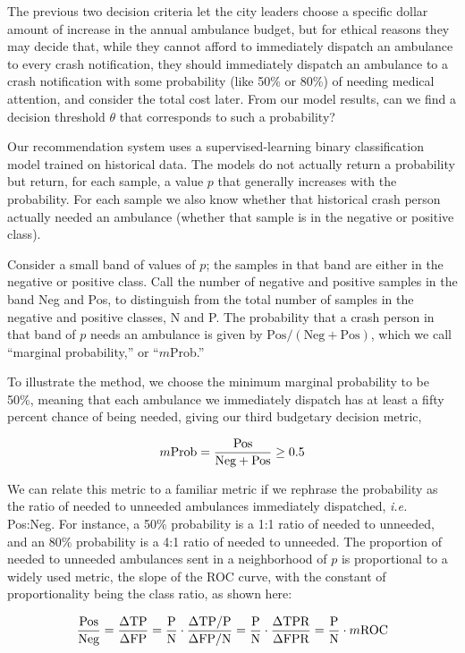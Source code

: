 The previous two decision criteria let the city leaders choose a specific dollar amount of increase in the annual ambulance budget, but for ethical reasons they may decide that, while they cannot afford to immediately dispatch an ambulance to every crash notification, they should immediately dispatch an ambulance to a crash notification with some probability (like 50\% or 80\%) of needing medical attention, and consider the total cost later.  From our model results, can we find a decision threshold $\theta$ that corresponds to such a probability?

Our recommendation system uses a supervised-learning binary classification model trained on historical data. The models do not actually return a probability but return, for each sample, a value $p$ that generally increases with the probability.  For each sample we also know whether that historical crash person actually needed an ambulance (whether that sample is in the negative or positive class).  

Consider a small band of values of $p$; the samples in that band are either in the negative or positive class.  Call the number of negative and positive samples in the band Neg and Pos, to distinguish from the total number of samples in the negative and positive classes, N and P.  The probability that a crash person in that band of $p$ needs an ambulance is given by 
$\text{Pos}/(\text{Neg} + \text{Pos})$, which we call ``marginal probability,'' or ``$m$Prob.''

To illustrate the method, we choose the minimum marginal probability to be 50\%, meaning that each ambulance we immediately dispatch has at least a fifty percent chance of being needed, giving our third budgetary decision metric,

\begin{equation} \label{eq:budget_3}\hfil
m\text{Prob} =  \frac{\text{Pos}}{\text{Neg}+\text{Pos}} \ge 0.5
\end{equation}


We can relate this metric to a familiar metric if we rephrase the probability as the ratio of needed to unneeded ambulances immediately dispatched, {\it i.e.} Pos:Neg.  For instance, a 50\% probability is a 1:1 ratio of needed to unneeded, and an 80\% probability is a 4:1 ratio of needed to unneeded.  
The proportion of needed to unneeded ambulances sent in a neighborhood of $p$ is proportional to a widely used metric, the slope of the ROC curve, with the constant of proportionality being the class ratio, as shown here:  

\begin{equation} \label{eq:ROC_slope}\hfil
\frac{\text{Pos}}{\text{Neg}}
=\frac{\Delta\text{TP}}{\Delta \text{FP}}
=\frac{\text{P}}{\text{N}} \cdot \frac{\Delta\text{TP}/\text{P}}{\Delta \text{FP}/\text{N}} 
=\frac{\text{P}}{\text{N}} \cdot \frac{\Delta\text{TPR}}{\Delta \text{FPR}}
=\frac{\text{P}}{\text{N}} \cdot m\text{ROC}
\end{equation}

